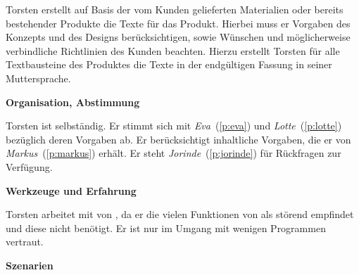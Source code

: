\begin{multicols}{2}

\begin{center}
\end{center}


Torsten erstellt auf Basis der vom Kunden gelieferten Materialien oder bereits bestehender Produkte die Texte für das Produkt. Hierbei muss er Vorgaben des Konzepts und des Designs berücksichtigen, sowie Wünschen und möglicherweise verbindliche Richtlinien des Kunden beachten. Hierzu erstellt Torsten für alle Textbausteine des Produktes die Texte in der endgültigen Fassung in seiner Muttersprache.

\textbf{Organisation, Abstimmung}

Torsten ist selbständig. Er stimmt sich mit \emph{Eva}~(\ref{p:eva}) und \emph{Lotte}~(\ref{p:lotte}) bezüglich deren Vorgaben ab. Er berücksichtigt inhaltliche Vorgaben, die er von \emph{Markus}~(\ref{p:markus}) erhält. Er steht  \emph{Jorinde}~(\ref{p:jorinde}) für Rückfragen zur Verfügung.

\textbf{Werkzeuge und Erfahrung}

Torsten arbeitet mit  von , da er die vielen Funktionen von  als störend empfindet und diese nicht benötigt. Er ist nur im Umgang mit wenigen Programmen vertraut.

\columnbreak

\textbf{Szenarien}


\end{multicols}

